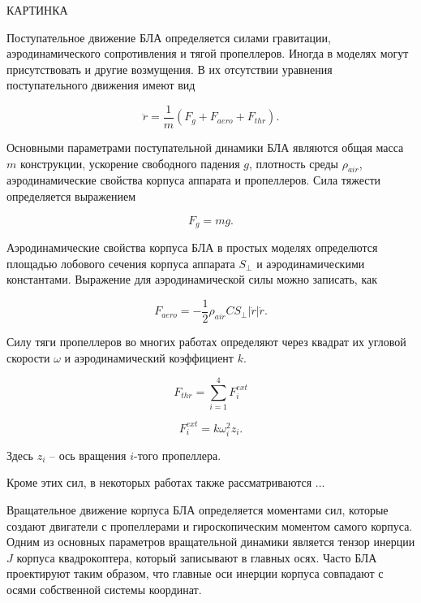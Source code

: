 \documentclass[a4paper,14pt,oneside,openany]{memoir}
\begin{document}
	
	КАРТИНКА
	
	
	Поступательное движение БЛА определяется силами гравитации, аэродинамического сопротивления и тягой пропеллеров. Иногда в моделях могут присутствовать и другие возмущения. В их отсутствии уравнения поступательного движения имеют вид
	
	\begin{equation} \label{eq:common_traslational_motion}
	\ddot{r} = \frac{1}{m}(F_g + F_{aero} + F_{thr}).
	\end{equation}
	
	Основными параметрами поступательной динамики БЛА являются общая масса {$m$} конструкции, ускорение свободного падения \textbf{{$g$}}, плотность среды {$\rho_{air}$}, аэродинамические свойства корпуса аппарата и пропеллеров. Сила тяжести определяется выражением
	
	\begin{equation} \label{eq:gravity_force}
	F_g = mg.
	\end{equation}
	
	Аэродинамические свойства корпуса БЛА в простых моделях определются площадью лобового сечения корпуса аппарата {$S_{\perp}$} и аэродинамическими константами. Выражение для аэродинамической силы можно записать, как
	 
	\begin{equation} \label{eq:aerodynamic_force}
	F_{aero} = - \frac{1}{2} \rho_{air} C S_{\perp} |\dot{r}| \dot{r}.
	\end{equation}
	
	Силу тяги пропеллеров во многих работах определяют через квадрат их угловой скорости $\omega$ и аэродинамический коэффициент $k$.
	
	\begin{equation} \label{eq:thrust_force}
	F_{thr} = \sum_{i=1}^{4}{ {F_{i}^{ext} }}
	\end{equation}
	
	\begin{equation} \label{eq:rotor_ext_force}
	F_{i}^{ext} = k \omega^2_i z_i.
	\end{equation}
	
	Здесь $z_i$ -- ось вращения $i$-того пропеллера.
	
    Кроме этих сил, в некоторых работах также рассматриваются ...
    
    Вращательное движение корпуса БЛА определяется моментами сил, которые создают двигатели с пропеллерами и гироскопическим моментом самого корпуса. Одним из основных параметров вращательной динамики является тензор инерции $J$ корпуса квадрокоптера, который записывают в главных осях. Часто БЛА проектируют таким образом, что главные оси инерции корпуса совпадают с осями собственной системы координат.
    
\end{document}
